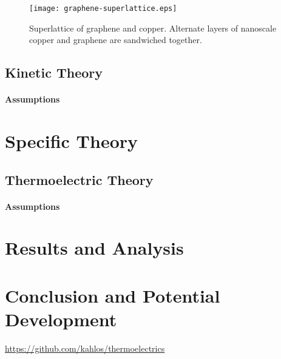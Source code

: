 \documentclass[12pt,draft]{article}
\begin{document}
\begin{figure}
	\centering
	\texttt{[image: graphene-superlattice.eps]}
	\caption{Superlattice of graphene and copper. Alternate layers of nanoscale copper and graphene are sandwiched together.}
	\label{fig:superlattice}
\end{figure}

\subsection{Kinetic Theory}
\paragraph{Assumptions}

\section{Specific Theory}
\subsection{Thermoelectric Theory}
\paragraph{Assumptions}

\section{Results and Analysis}

\section{Conclusion and Potential Development}

\url{https://github.com/kahlos/thermoelectrics}
\end{document}
